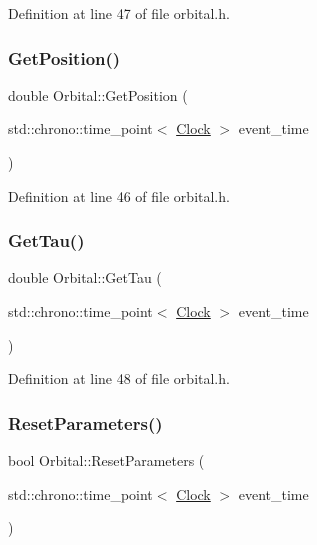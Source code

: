 Definition at line 47 of file orbital.\+h.

\mbox{\label{class_orbital_aea872758f844534806a638080a39507e}} 
\subsubsection{\texorpdfstring{Get\+Position()}{GetPosition()}}
{\footnotesize\ttfamily double Orbital\+::\+Get\+Position (\begin{DoxyParamCaption}\item[{std\+::chrono\+::time\+\_\+point$<$ \mbox{\hyperlink{universe_8h_a0ef8d951d1ca5ab3cfaf7ab4c7a6fd80}{Clock}} $>$}]{event\+\_\+time }\end{DoxyParamCaption})\hspace{0.3cm}{\ttfamily [inline]}}



Definition at line 46 of file orbital.\+h.

\mbox{\label{class_orbital_aeb7758cc920cb862fdc33374c26cb585}} 
\subsubsection{\texorpdfstring{Get\+Tau()}{GetTau()}}
{\footnotesize\ttfamily double Orbital\+::\+Get\+Tau (\begin{DoxyParamCaption}\item[{std\+::chrono\+::time\+\_\+point$<$ \mbox{\hyperlink{universe_8h_a0ef8d951d1ca5ab3cfaf7ab4c7a6fd80}{Clock}} $>$}]{event\+\_\+time }\end{DoxyParamCaption})\hspace{0.3cm}{\ttfamily [inline]}}



Definition at line 48 of file orbital.\+h.

\mbox{\label{class_orbital_acc6137a5a79be91a255f685a2f065330}} 
\subsubsection{\texorpdfstring{Reset\+Parameters()}{ResetParameters()}}
{\footnotesize\ttfamily bool Orbital\+::\+Reset\+Parameters (\begin{DoxyParamCaption}\item[{std\+::chrono\+::time\+\_\+point$<$ \mbox{\hyperlink{universe_8h_a0ef8d951d1ca5ab3cfaf7ab4c7a6fd80}{Clock}} $>$}]{event\+\_\+time }\end{DoxyParamCaption})}




